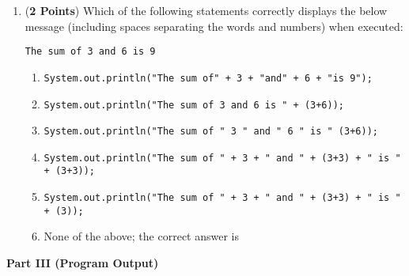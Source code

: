 \documentclass[12pt]{article}
\begin{document}
\begin{enumerate}
\bigskip
\bigskip

\item ({\bf 2 Points})
  Which of the following statements correctly displays the below 
  message (including spaces separating the words and numbers) when executed:
  \begin{center}
    \verb$The sum of 3 and 6 is 9$
  \end{center}
  \begin{enumerate}
    \item \verb$System.out.println("The sum of" + 3 + "and" + 6 + "is 9");$
    \item \verb$System.out.println("The sum of 3 and 6 is " + (3+6));$
    \item \verb$System.out.println("The sum of " 3 " and " 6 " is " (3+6));$
    \item \verb$System.out.println("The sum of " + 3 + " and " + (3+3) + " is " + (3+3));$
    \item \verb$System.out.println("The sum of " + 3 + " and " + (3+3) + " is " + (3));$
    \item None of the above; the correct answer is \underline{\hspace{3in}}
  \end{enumerate}

\end{enumerate}

\newpage

\noindent
{\bf Part III (Program Output)}
\end{document}

